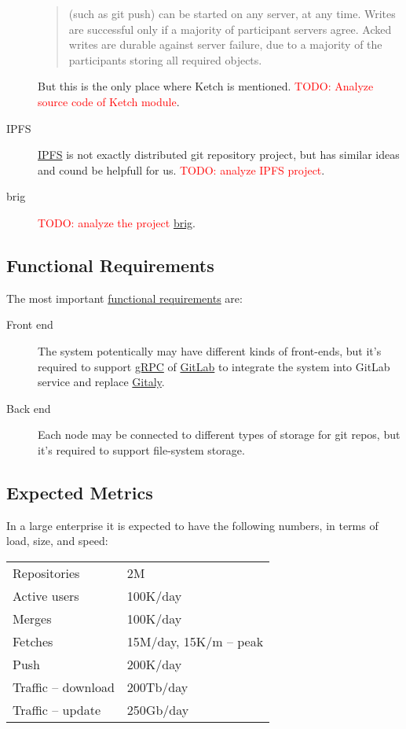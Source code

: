 \documentclass[acmlarge, screen, nonacm]{acmart}
\newcommand{\todo}[1]{\textcolor{red}{TODO: #1}}
\begin{document}
\begin{description}
\begin{quote}
      (such as git push) can be started on any server, at any time. Writes
      are successful only if a majority of participant servers agree.
      Acked writes are durable against server failure, due to a majority of
      the participants storing all required objects.
    \end{quote}
    But this is the only place where Ketch is mentioned. \todo{Analyze source code of Ketch module}.
  \item[IPFS]
    \href{https://ipfs.io/}{IPFS} is not exactly distributed git repository project, but has similar ideas
    and cound be helpfull for us. \todo{analyze IPFS project}.
  \item[brig]
    \todo{analyze the project} \href{https://github.com/sahib/brig}{brig}.
\end{description}

\subsection{Functional Requirements}
\label{sec:nfr}

The most important \href{https://en.wikipedia.org/wiki/Functional_requirement}{functional requirements} are:

\begin{description}
  \item[Front end]
    The system potentically may have different kinds of front-ends,
    but it's required to support \href{https://grpc.io/}{gRPC}
    of \href{https://about.gitlab.com/}{GitLab} to integrate the system
    into GitLab service and replace
    \href{https://docs.gitlab.com/ee/administration/gitaly/}{Gitaly}.
  \item[Back end]
    Each node may be connected to different types of storage for git repos,
    but it's required to support file-system storage.
\end{description}

\subsection{Expected Metrics}
\label{ref:metrics}

In a large enterprise it is expected to have the following
numbers, in terms of load, size, and speed:

\begin{tabular}{ll}
  Repositories & 2M \\
  Active users & 100K/day \\
  Merges & 100K/day \\
  Fetches & 15M/day, 15K/m -- peak \\
  Push & 200K/day \\
  Traffic -- download & 200Tb/day \\
  Traffic -- update & 250Gb/day \\
\end{tabular}
\end{document}

